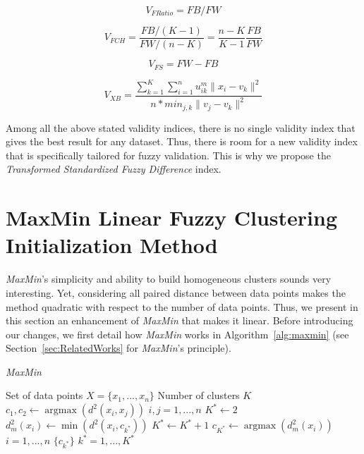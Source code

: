 \documentclass[runningheads,a4paper]{llncs}
\DeclareMathOperator*{\argmax}{argmax}
\begin{document}
\begin{equation} \label{Ratio_eqn}
V_{FRatio} = FB/FW
\end{equation}

\begin{equation} \label{CH_eqn}
V_{FCH} = \frac{FB/(K-1)} {FW/(n-K)} = \frac {n-K}{K-1} \frac {FB}{FW}
\end{equation}

\begin{equation} \label{Fukuyama_eqn}
V_{FS} = FW - FB
\end{equation}

\begin{equation} \label{XieBeni_eqn}
V_{XB} = \frac{\sum_{k=1}^K \sum_{i=1}^n u_{ik}^m \|x_i - v_k\|^2}{n* min_{j,k} \|v_j - v_k\|^2}
\end{equation}

Among all the above stated validity indices, there is no single validity index that gives the best result for any dataset. Thus, there is room for a new validity index that is specifically tailored for fuzzy validation. This is why we propose the \textit{Transformed Standardized Fuzzy Difference} index.

\section{MaxMin Linear Fuzzy Clustering Initialization Method}
\label{sec:ContributionMaxMinLinear}

\textit{MaxMin}'s simplicity and ability to build homogeneous clusters sounds very interesting. Yet, considering all paired distance between data points makes the method quadratic with respect to the number of data points. Thus, we present in this section an enhancement of \textit{MaxMin} that makes it linear. Before introducing our changes, we first detail how \textit{MaxMin} works in Algorithm~\ref{alg:maxmin} (see Section~\ref{sec:RelatedWorks} for \textit{MaxMin}'s principle).

\begin{algorithm}
\caption{\textit{MaxMin}}
\label{alg:maxmin}
\begin{algorithmic}
	\REQUIRE Set of data points $X = \{x_1,...,x_n\}$
    \REQUIRE Number of clusters $K$
	\STATE {}
	\STATE $c_1, c_2 \leftarrow \argmax(d^2(x_i, x_j))$ $i, j = 1,...,n$
	\STATE $K^* \leftarrow 2$ 
	\STATE {}
			\STATE $d^2_m(x_i) \leftarrow \min(d^2(x_i, c_{k^*}))$
		\ENDFOR
		\STATE $K^* \leftarrow K^* + 1$		
		\STATE $c_{K^*} \leftarrow \argmax(d^2_m(x_i))$ $i = 1,...,n$
	\ENDWHILE
	\RETURN $\{c_{k^*}\}$ $k^* = 1,...,K^*$
\end{algorithmic}
\end{algorithm} 
\end{document}
